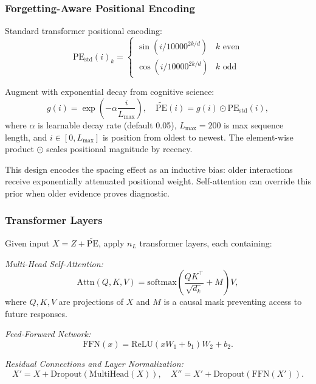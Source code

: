 \documentclass[preprint,12pt]{elsarticle}
\begin{document}
\subsubsection{Forgetting-Aware Positional Encoding}

Standard transformer positional encoding:
\begin{equation}
\text{PE}_{\text{std}}(i)_k = \begin{cases}
\sin(i / 10000^{2k/d}) & k \text{ even}\\
\cos(i / 10000^{2k/d}) & k \text{ odd}
\end{cases}
\label{eq:pe-standard}
\end{equation}

Augment with exponential decay from cognitive science:
\begin{equation}
g(i) = \exp\left(-\alpha \frac{i}{L_{\max}}\right), \quad \widetilde{\text{PE}}(i) = g(i) \odot \text{PE}_{\text{std}}(i),
\label{eq:pe-decay}
\end{equation}
where $\alpha$ is learnable decay rate (default 0.05), $L_{\max}=200$ is max sequence length, and $i \in [0, L_{\max}]$ is position from oldest to newest. The element-wise product $\odot$ scales positional magnitude by recency.

This design encodes the spacing effect as an inductive bias: older interactions receive exponentially attenuated positional weight. Self-attention can override this prior when older evidence proves diagnostic.

\subsubsection{Transformer Layers}

Given input $X = Z + \widetilde{\text{PE}}$, apply $n_L$ transformer layers, each containing:

\textit{Multi-Head Self-Attention:}
\begin{equation}
\text{Attn}(Q, K, V) = \text{softmax}\left(\frac{QK^\top}{\sqrt{d_k}} + M\right)V,
\label{eq:attention}
\end{equation}
where $Q, K, V$ are projections of $X$ and $M$ is a causal mask preventing access to future responses.

\textit{Feed-Forward Network:}
\begin{equation}
\text{FFN}(x) = \text{ReLU}(xW_1 + b_1)W_2 + b_2.
\label{eq:ffn}
\end{equation}

\textit{Residual Connections and Layer Normalization:}
\begin{equation}
X' = X + \text{Dropout}(\text{MultiHead}(X)), \quad X'' = X' + \text{Dropout}(\text{FFN}(X')).
\label{eq:residual}
\end{equation}
\end{document}
